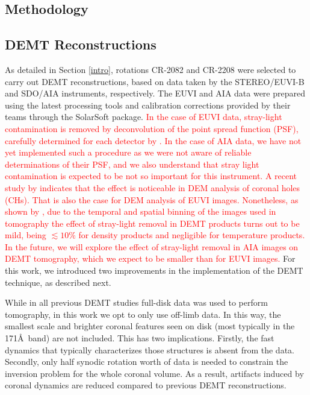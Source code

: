 \documentclass[namedreferences]{solarphysics}
\def\edit#1{\textcolor{Red}{#1}}
\begin{document}
\begin{article}
\section{Methodology}\label{meto}   

\subsection{{DEMT Reconstructions}}\label{demt}

{As detailed in Section \ref{intro}, rotations CR-2082 and CR-2208 were selected to carry out DEMT reconstructions, based on data taken by the STEREO/EUVI-B and SDO/AIA instruments, respectively.} The EUVI and AIA data were prepared using the latest processing tools and calibration corrections provided by their teams through the SolarSoft package. \edit{In the case of EUVI data, stray-light contamination is removed by deconvolution of the point spread function (PSF), carefully determined for each detector by \citet{shearer_2012}. In the case of AIA data, we have not yet implemented such a procedure as we were not aware of reliable determinations of their PSF, and we also understand that stray light contamination is expected to be not so important for this instrument. A recent study by \citet{saqri_2020} indicates that the effect is noticeable in DEM analysis of coronal holes (CHs). That is also the case for DEM analysis of EUVI images. Nonetheless, as shown by \citet{lloveras_2017}, due to the temporal and spatial binning of the images used in tomography the effect of stray-light removal in DEMT products turns out to be mild, being $\lesssim 10\%$ for density products and negligible for temperature products. In the future, we will explore the effect of stray-light removal in AIA images on DEMT tomography, which we expect to be smaller than for EUVI images.} For this work, we introduced two improvements in the implementation of the DEMT technique, as described next.

{While in all previous DEMT studies full-disk data was used to perform tomography, in this work we {opt} to only use off-limb data. In this way, the smallest scale and brighter coronal features seen on disk (most typically in the 171\AA\ band) are not included. This has two implications. Firstly, the fast dynamics that typically characterizes those structures is absent from the data. Secondly, only half synodic rotation worth of data is needed to constrain the inversion problem for the whole coronal volume. As a result, {artifacts induced by coronal dynamics} are reduced compared to previous DEMT reconstructions.}


\end{article}
\end{document}
